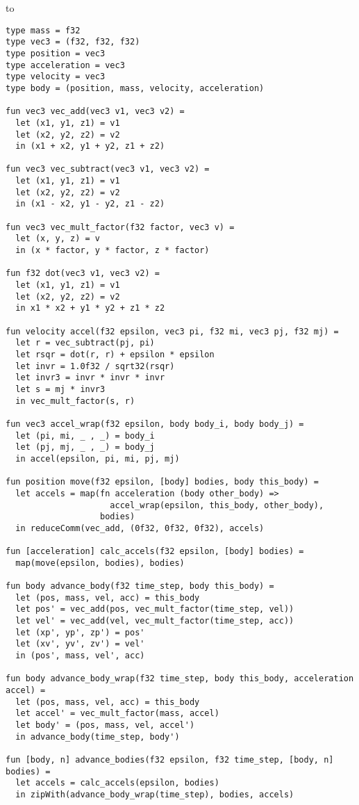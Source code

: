 to

\begin{lstlisting}
type mass = f32
type vec3 = (f32, f32, f32)
type position = vec3
type acceleration = vec3
type velocity = vec3
type body = (position, mass, velocity, acceleration)

fun vec3 vec_add(vec3 v1, vec3 v2) =
  let (x1, y1, z1) = v1
  let (x2, y2, z2) = v2
  in (x1 + x2, y1 + y2, z1 + z2)

fun vec3 vec_subtract(vec3 v1, vec3 v2) =
  let (x1, y1, z1) = v1
  let (x2, y2, z2) = v2
  in (x1 - x2, y1 - y2, z1 - z2)

fun vec3 vec_mult_factor(f32 factor, vec3 v) =
  let (x, y, z) = v
  in (x * factor, y * factor, z * factor)

fun f32 dot(vec3 v1, vec3 v2) =
  let (x1, y1, z1) = v1
  let (x2, y2, z2) = v2
  in x1 * x2 + y1 * y2 + z1 * z2

fun velocity accel(f32 epsilon, vec3 pi, f32 mi, vec3 pj, f32 mj) =
  let r = vec_subtract(pj, pi)
  let rsqr = dot(r, r) + epsilon * epsilon
  let invr = 1.0f32 / sqrt32(rsqr)
  let invr3 = invr * invr * invr
  let s = mj * invr3
  in vec_mult_factor(s, r)

fun vec3 accel_wrap(f32 epsilon, body body_i, body body_j) =
  let (pi, mi, _ , _) = body_i
  let (pj, mj, _ , _) = body_j
  in accel(epsilon, pi, mi, pj, mj)

fun position move(f32 epsilon, [body] bodies, body this_body) =
  let accels = map(fn acceleration (body other_body) =>
                     accel_wrap(epsilon, this_body, other_body),
                   bodies)
  in reduceComm(vec_add, (0f32, 0f32, 0f32), accels)

fun [acceleration] calc_accels(f32 epsilon, [body] bodies) =
  map(move(epsilon, bodies), bodies)

fun body advance_body(f32 time_step, body this_body) =
  let (pos, mass, vel, acc) = this_body
  let pos' = vec_add(pos, vec_mult_factor(time_step, vel))
  let vel' = vec_add(vel, vec_mult_factor(time_step, acc))
  let (xp', yp', zp') = pos'
  let (xv', yv', zv') = vel'
  in (pos', mass, vel', acc)

fun body advance_body_wrap(f32 time_step, body this_body, acceleration accel) =
  let (pos, mass, vel, acc) = this_body
  let accel' = vec_mult_factor(mass, accel)
  let body' = (pos, mass, vel, accel')
  in advance_body(time_step, body')

fun [body, n] advance_bodies(f32 epsilon, f32 time_step, [body, n] bodies) =
  let accels = calc_accels(epsilon, bodies)
  in zipWith(advance_body_wrap(time_step), bodies, accels)


\end{lstlisting}
